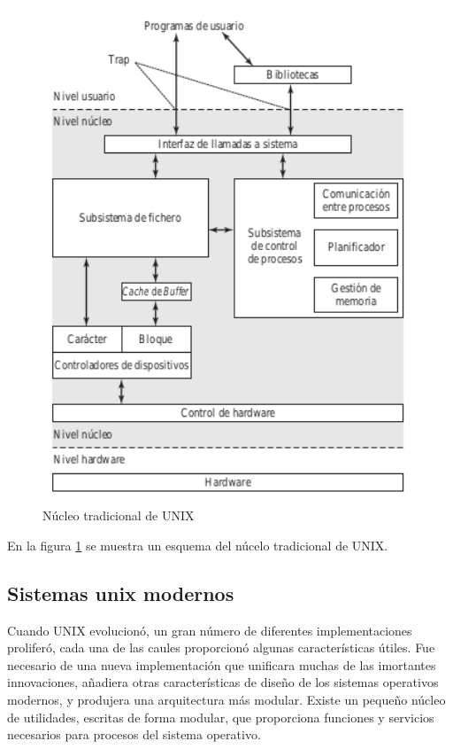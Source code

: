\documentclass{article}
\begin{document}
				\begin{figure}
				\caption{Núcleo tradicional de UNIX}
				\label{figura24:nucleoUNIX}
				\centering
				\includegraphics[width=1.1\textwidth, scale=1]{figura24.png}
				\end{figure}
				
				En la figura \ref{figura24:nucleoUNIX} se muestra un esquema del núcelo tradicional de UNIX.
				
		\subsection{Sistemas unix modernos}
			Cuando UNIX evolucionó, un gran número de diferentes implementaciones proliferó, cada una de las caules proporcionó algunas características útiles. Fue necesario de una nueva implementación que unificara muchas de las imortantes innovaciones, añadiera otras características de diseño de los sistemas operativos modernos, y produjera una arquitectura más modular. Existe un pequeño núcleo de utilidades, escritas de forma modular, que proporciona funciones y servicios necesarios para procesos del sistema operativo.
			
\end{document}
